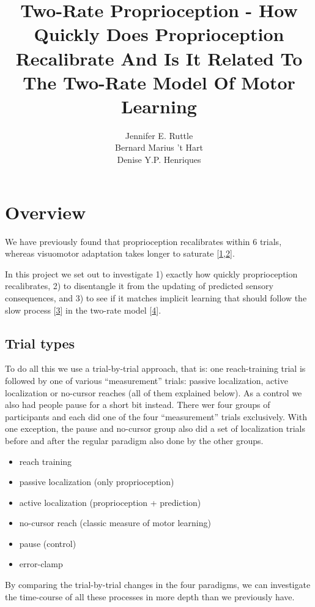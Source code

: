 \documentclass[]{article}
\title{Two-Rate Proprioception - How Quickly Does Proprioception Recalibrate
And Is It Related To The Two-Rate Model Of Motor Learning}
\author{Jennifer E. Ruttle \\ Bernard Marius 't Hart \\ Denise Y.P. Henriques}
\date{}
\providecommand{\tightlist}{%
  \setlength{\itemsep}{0pt}\setlength{\parskip}{0pt}}
\begin{document}
\maketitle

\section{Overview}\label{overview}

We have previously found that proprioception recalibrates within 6
trials, whereas visuomotor adaptation takes longer to saturate
{[}\protect\hyperlink{ref-Ruttle2016}{1},\protect\hyperlink{ref-Ruttle2018}{2}{]}.

In this project we set out to investigate 1) exactly how quickly
proprioception recalibrates, 2) to disentangle it from the updating of
predicted sensory consequences, and 3) to see if it matches implicit
learning that should follow the slow process
{[}\protect\hyperlink{ref-McDougle2015}{3}{]} in the two-rate model
{[}\protect\hyperlink{ref-Smith2006}{4}{]}.

\subsection{Trial types}\label{trial-types}

To do all this we use a trial-by-trial approach, that is: one
reach-training trial is followed by one of various ``measurement''
trials: passive localization, active localization or no-cursor reaches
(all of them explained below). As a control we also had people pause for
a short bit instead. There wer four groups of participants and each did
one of the four ``measurement'' trials exclusively. With one exception,
the pause and no-cursor group also did a set of localization trials
before and after the regular paradigm also done by the other groups.

\begin{itemize}
\tightlist
\item
  reach training
\item
  passive localization (only proprioception)
\item
  active localization (proprioception + prediction)
\item
  no-cursor reach (classic measure of motor learning)
\item
  pause (control)
\item
  error-clamp
\end{itemize}

By comparing the trial-by-trial changes in the four paradigms, we can
investigate the time-course of all these processes in more depth than we
previously have.
\end{document}
